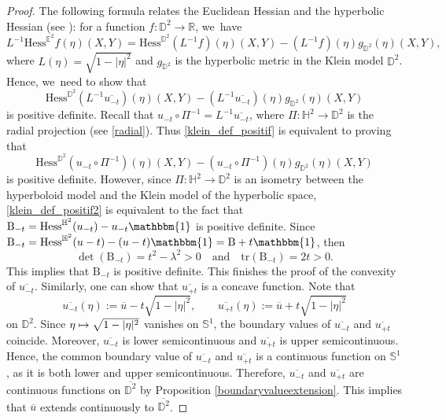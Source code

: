 \documentclass[JEP,XML,SOM,Unicode,NoEqCountersInSection, NoFloatCountersInSection,published]{cedram}
\newcommand\mto{\mathchoice{\longmapsto}{\mapsto}{\mapsto}{\mapsto}}
\theoremstyle{plain}
\theoremstyle{definition}
\newcommand{\hess}{\mathrm{Hess}^{\mathbb{H}^2}}
\newcommand{\B}{\mathrm{B}}
\begin{document}
\begin{proof}
The following formula relates the Euclidean Hessian and the hyperbolic Hessian (see \cite[Cor.\,2.7]{barbotfillastre}): for a function \(f: \mathbb{D}^2 \to \mathbb{R} \), we~have
\[
L^{-1} \mathrm{Hess}^{\mathbb{E}^2} f(\eta)(X,Y) = \mathrm{Hess}^{\mathbb{D}^2}(L^{-1} f)(\eta)(X,Y) - (L^{-1} f)(\eta) g_{\mathbb{D}^2}(\eta)(X,Y),
\]
where \(L(\eta) = \sqrt{1 - \lvert \eta \rvert^2} \) and \(g_{\mathbb{D}^2} \) is the hyperbolic metric in the Klein model \(\mathbb{D}^2\). Hence, we~need to show that
\begin{equation}\label{klein_def_positif}
\mathrm{Hess}^{\mathbb{D}^2}(L^{-1} \overline{u_{{-t}}})(\eta)(X,Y) - (L^{-1} \overline{u_{{-t}}})(\eta) g_{\mathbb{D}^2}(\eta)(X,Y)
\end{equation}
is positive definite. Recall that \(u_{-t} \circ \Pi^{-1} = L^{-1} \overline{u_{-t}} \), where \(\Pi: \mathbb{H}^2 \to \mathbb{D}^2 \) is the radial projection (see \eqref{radial}). Thus \eqref{klein_def_positif} is equivalent to proving that
\begin{equation}\label{klein_def_positif2}
\mathrm{Hess}^{\mathbb{D}^2}(u_{-t} \circ \Pi^{-1})(\eta)(X,Y) - (u_{-t} \circ \Pi^{-1})(\eta) g_{\mathbb{D}^2}(\eta)(X,Y)
\end{equation}
is positive definite. However, since \(\Pi: \mathbb{H}^2 \to \mathbb{D}^2\) is an isometry between the hyperboloid model and the Klein model of the hyperbolic space, \eqref{klein_def_positif2} is equivalent to the fact that \(\B_{{-t}} = \hess(u_{-t}) - u_{-t} \mathbbm{1} \) is positive definite. Since \(\B_{{-t}} = \hess(u - t) - (u - t) \mathbbm{1} = \B + t \mathbbm{1} \), then
\[
\det(\B_{{-t}}) = t^2 - \lambda^2 > 0 \quad \text{and} \quad \mathrm{tr}(\B_{{-t}}) = 2t > 0.
\]
This implies that \(\B_{{-t}} \) is positive definite. This finishes the proof of the convexity of \(\overline{u_{{-t}}} \). Similarly, one can show that \(\overline{u_{{+t}}} \) is a concave function.
Note that
\[
\overline{u_{-t}}(\eta) := \overline{u} - t\sqrt{1-\lvert\eta\rvert^2}, \qquad \overline{u_{+t}}(\eta) := \overline{u} +t\sqrt{1-\lvert\eta\rvert^2}
\]
on $\mathbb{D}^2$. Since $\eta\mto\sqrt{1-\lvert\eta\rvert^2}$ vanishes on $\mathbb{S}^1$, the boundary values of $\overline{u_{-t}}$ and $\overline{u_{+t}}$ coincide. Moreover, $\overline{u_{-t}}$ is lower semicontinuous and $\overline{u_{+t}}$ is upper semicontinuous. Hence, the common boundary value of $\overline{u_{-t}}$ and $\overline{u_{+t}}$ is a continuous function on $\mathbb{S}^1$, as it is both lower and upper semicontinuous. Therefore, $\overline{u_{-t}}$ and $\overline{u_{+t}}$ are continuous functions on $\overline{\mathbb{D}^2}$ by Proposition \ref{boundaryvalueextension}. This implies that $\overline{u}$ extends continuously to $\overline{\mathbb{D}^2}$.\end{proof}
\end{document}
